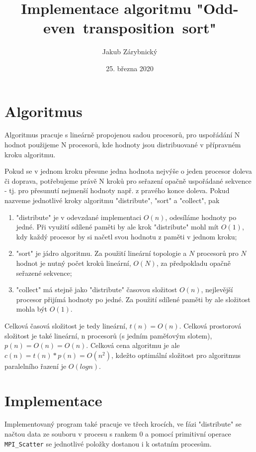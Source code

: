 \documentclass[11pt]{article}
\author{Jakub Zárybnický}
\date{25. března 2020}
\title{Implementace algoritmu "Odd-even~transposition~sort"}
\begin{document}
\maketitle

\section{Algoritmus}
\label{sec:orgfc8b5dd}
Algoritmus pracuje s lineárně propojenou sadou procesorů, pro uspořádání N
hodnot použijeme N procesorů, kde hodnoty jsou distribuované v přípravném kroku
algoritmu.

Pokud se v jednom kroku přesune jedna hodnota nejvýše o jeden procesor doleva či
doprava, potřebujeme právě N kroků pro seřazení opačně uspořádané sekvence -
tj. pro přesunutí nejmenší hodnoty např. z pravého konce doleva. Pokud nazveme
jednotlivé kroky algoritmu "distribute", "sort" a "collect", pak
\begin{enumerate}
\item "distribute" je v odevzdané implementaci \(O(n)\), odesíláme hodnoty po
jedné. Při využití sdílené paměti by ale krok "distribute" mohl mít \(O(1)\),
kdy každý procesor by si načetl svou hodnotu z paměti v jednom kroku;
\item "sort" je jádro algoritmu. Za použití lineární topologie a \(N\) procesorů pro
\(N\) hodnot je nutný počet kroků lineární, \(O(N)\), za předpokladu opačně
seřazené sekvence;
\item "collect" má stejně jako "distribute" časovou složitost \(O(n)\), nejlevější
procesor přijímá hodnoty po jedné. Za použití sdílené paměti by ale
složitost mohla být \(O(1)\).
\end{enumerate}

Celková časová složitost je tedy lineární, \(t(n) = O(n)\). Celková prostorová
složitost je také lineární, n procesorů (s jedním paměťovým slotem), \(p(n) =
O(n) = O(n)\). Celková cena algoritmu je ale \(c(n) = t(n) * p(n) = O(n^2)\),
kdežto optimální složitost pro algoritmus paralelního řazení je \(O(log n)\).

\section{Implementace}
\label{sec:org6243153}
Implementovaný program také pracuje ve třech krocích, ve fázi "distribute" se
načtou data ze souboru v procesu s rankem 0 a pomocí primitivní operace
\texttt{MPI\_Scatter} se jednotlivé položky dostanou i k ostatním procesům.
\end{document}
